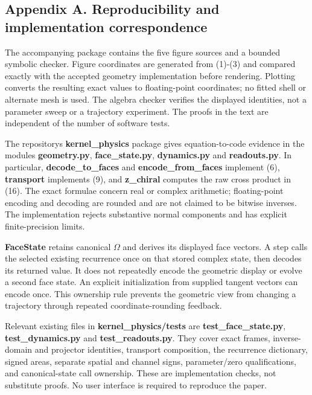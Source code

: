 \documentclass[
  11pt,
  a4paper,
]{article}
\begin{document}
\subsection{Appendix A. Reproducibility and implementation correspondence}\label{appendix-a.-reproducibility-and-implementation-correspondence}

The accompanying package contains the five figure sources and a bounded symbolic checker. Figure coordinates are generated from (1)-(3) and compared exactly with the accepted geometry implementation before rendering. Plotting converts the resulting exact values to floating-point coordinates; no fitted shell or alternate mesh is used. The algebra checker verifies the displayed identities, not a parameter sweep or a trajectory experiment. The proofs in the text are independent of the number of software tests.

The repository\textquotesingle s \textbf{kernel\_physics} package gives equation-to-code evidence in the modules \textbf{geometry.py}, \textbf{face\_state.py}, \textbf{dynamics.py} and \textbf{readouts.py}. In particular, \textbf{decode\_to\_faces} and \textbf{encode\_from\_faces} implement (6), \textbf{transport} implements (9), and \textbf{z\_chiral} computes the raw cross product in (16). The exact formulae concern real or complex arithmetic; floating-point encoding and decoding are rounded and are not claimed to be bitwise inverses. The implementation rejects substantive normal components and has explicit finite-precision limits.

\textbf{FaceState} retains canonical \(\Omega\) and derives its displayed face vectors. A step calls the selected existing recurrence once on that stored complex state, then decodes its returned value. It does not repeatedly encode the geometric display or evolve a second face state. An explicit initialization from supplied tangent vectors can encode once. This ownership rule prevents the geometric view from changing a trajectory through repeated coordinate-rounding feedback.

Relevant existing files in \textbf{kernel\_physics/tests} are \textbf{test\_face\_state.py}, \textbf{test\_dynamics.py} and \textbf{test\_readouts.py}. They cover exact frames, inverse-domain and projector identities, transport composition, the recurrence dictionary, signed areas, separate spatial and channel signs, parameter/zero qualifications, and canonical-state call ownership. These are implementation checks, not substitute proofs. No user interface is required to reproduce the paper.
\end{document}
